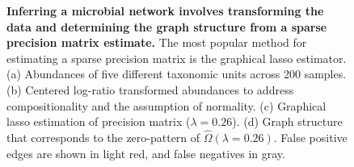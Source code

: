\documentclass[
  a4paper,
]{article}
\begin{document}
\begin{figure}

\begin{minipage}[t]{0.50\linewidth}

{\centering 


}

\subcaption{\label{fig-conceptual-1}}
\end{minipage}%
%
\begin{minipage}[t]{0.50\linewidth}

{\centering 


}

\subcaption{\label{fig-conceptual-2}}
\end{minipage}%
\newline
\begin{minipage}[t]{0.50\linewidth}

{\centering 


}

\subcaption{\label{fig-conceptual-3}}
\end{minipage}%
%
\begin{minipage}[t]{0.50\linewidth}

{\centering 


}

\subcaption{\label{fig-conceptual-4}}
\end{minipage}%

\caption{\label{fig-conceptual}\textbf{Inferring a microbial network
involves transforming the data and determining the graph structure from
a sparse precision matrix estimate.} The most popular method for
estimating a sparse precision matrix is the graphical lasso estimator.
(a) Abundances of five different taxonomic units across 200 samples. (b)
Centered log-ratio transformed abundances to address compositionality
and the assumption of normality. (c) Graphical lasso estimation of
precision matrix (\(\lambda = 0.26\)). (d) Graph structure that
corresponds to the zero-pattern of \(\hat \Omega(\lambda = 0.26)\).
False positive edges are shown in light red, and false negatives in
gray.}

\end{figure}
\end{document}
